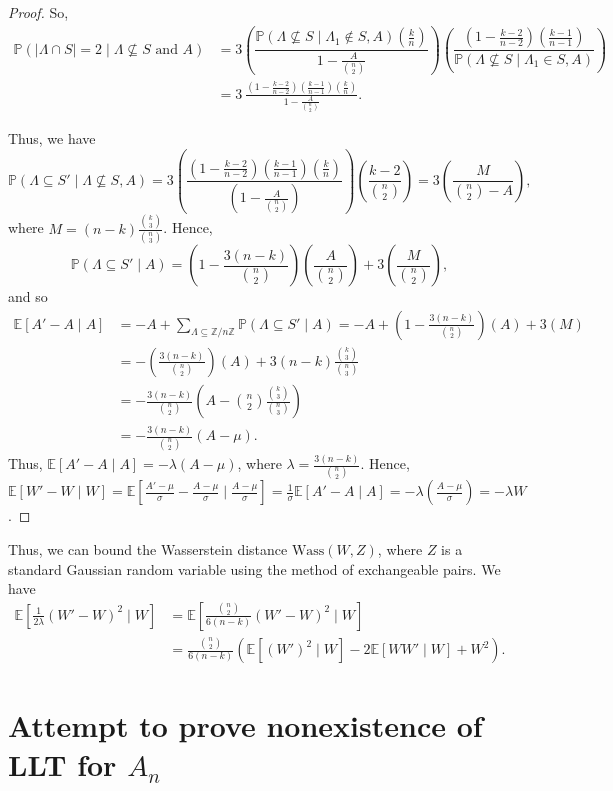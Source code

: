 \documentclass[12pt]{article} %
\newcommand{\p}[1]{\left(#1\right)}
\newcommand{\s}[1]{\left[#1\right]}
\newcommand{\abs}[1]{\left\lvert#1\right\rvert}
\newcommand{\Wass}{\mathrm{Wass}}
\renewcommand{\P}{\mathbb{P}}
\newcommand{\E}{\mathbb{E}}
\newcommand{\Z}{\mathbb{Z}}
\theoremstyle{definition}
\theoremstyle{definition}
\begin{document}
\begin{proof}
So,
\begin{align*}
\P(\abs{\Lambda \cap S} = 2 \mid \Lambda \not \subseteq S\text{ and } A) &= 3\p{\dfrac{\P(\Lambda \not \subseteq S \mid \Lambda_1 \notin S, A)\p{\frac{k}{n}}}{1-\frac{A}{\binom{n}{2}}}}\p{\dfrac{\p{1-\frac{k-2}{n-2}}\p{\frac{k-1}{n-1}}}{\P(\Lambda \not \subseteq S \mid \Lambda_1 \in S, A)}} \\
&= 3\ \frac{\p{1-\frac{k-2}{n-2}}\p{\frac{k-1}{n-1}}\p{\frac{k}{n}}}{1-\frac{A}{{n\choose2}}}.
\end{align*}

Thus, we have 
\[\P(\Lambda \subseteq S' \mid \Lambda \not \subseteq S, A) = 3 \p{\frac{\p{1-\frac{k-2}{n-2}}\p{\frac{k-1}{n-1}}\p{\frac{k}{n}}}{\p{1-\frac{A}{{n\choose2}}}}}\p{\frac{k-2}{{n\choose2}}} = 3\p{\frac{M}{{n\choose2} - A}},\] where $M = (n-k)\frac{{k\choose3}}{{n\choose3}}$. Hence,
\[\P(\Lambda \subseteq S' \mid A) = \p{1 - \frac{3(n-k)}{{n\choose2}}}\p{\frac{A}{{n\choose2}}} + 3\p{\frac{M}{{n\choose2}}},
\]
and so
\begin{align*}
\E[A' - A \mid A] &= -A + \sum_{\Lambda \subseteq \Z / n\Z} \P(\Lambda \subseteq S' \mid A)= -A + \p{1 - \frac{3(n-k)}{{n\choose2}}}\p{A} + 3\p{M} \\
&= -\p{\frac{3(n - k)}{{n\choose2}}}(A) + 3(n-k)\frac{{k\choose3}}{{n\choose3}} \\
&= -\frac{3(n-k)}{{n\choose2}}\p{A-\binom{n}{2}\frac{\binom{k}{3}}{\binom{n}{3}}} \\
&= -\frac{3(n-k)}{{n\choose2}}(A-\mu).
\end{align*}
Thus, 
$\E[A'-A \mid A] = -\lambda(A-\mu)$, where $\lambda = \frac{3(n-k)}{{n\choose2}}$. 
Hence, $\E[W'-W \mid W] = \E[\frac{A'-\mu}{\sigma} - \frac{A-\mu}{\sigma} \mid \frac{A-\mu}{\sigma}] = \frac{1}{\sigma}\E[A'-A \mid A] = -\lambda\p{\frac{A-\mu}{\sigma}} = -\lambda W$.

\end{proof}

Thus, we can bound the Wasserstein distance $\Wass(W, Z)$, where $Z$ is a standard Gaussian random variable using the method of exchangeable pairs. 
We have
\begin{align*}
\E\s{\frac{1}{2\lambda}(W'-W)^2 \mid W}
&= \E\s{\frac{{n\choose2}}{6(n-k)}(W'-W)^2 \mid W} \\
&= \frac{{n\choose2}}{6(n-k)}(\E[(W')^2 \mid W]-2\E[WW' \mid W]+W^2).
\end{align*}


\section{Attempt to prove nonexistence of LLT for $A_n$}
\end{document}
